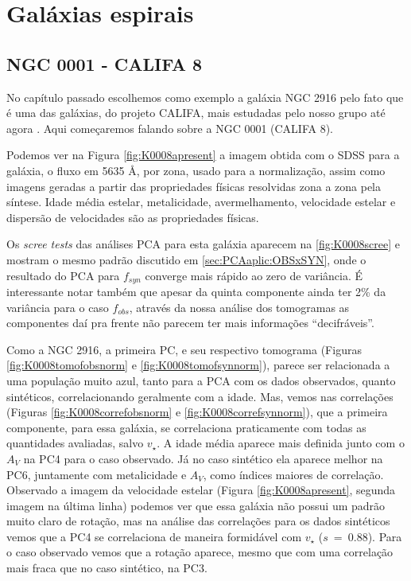 \section{Galáxias espirais}
\label{sec:result:spirals}

\subsection{NGC 0001 - CALIFA 8}

No capítulo passado escolhemos como exemplo a galáxia NGC 2916 pelo fato que é uma das galáxias, do projeto CALIFA, mais
estudadas pelo nosso grupo até agora \citep{CidFernandes2013, CidFernandes2014}. Aqui começaremos falando sobre a NGC
0001 (CALIFA 8). 

Podemos ver na Figura \ref{fig:K0008apresent} a imagem obtida com o SDSS para a galáxia, o fluxo em 5635 \AA, por zona,
usado para a normalização, assim como imagens geradas a partir das propriedades físicas resolvidas zona a zona pela
síntese. Idade média estelar, metalicidade, avermelhamento, velocidade estelar e dispersão de velocidades são
as propriedades físicas. 

Os {\em scree tests} das análises PCA para esta galáxia aparecem na \ref{fig:K0008scree} e mostram o mesmo padrão
discutido em \ref{sec:PCAaplic:OBSxSYN}, onde o resultado do PCA para $f_{syn}$ converge mais rápido ao zero de
variância. É interessante notar também que apesar da quinta componente ainda ter 2\% da variância para o caso $f_{obs}$,
através da nossa análise dos tomogramas as componentes daí pra frente não parecem ter mais informações ``decifráveis''.

Como a NGC 2916, a primeira PC, e seu respectivo tomograma (Figuras \ref{fig:K0008tomofobsnorm} e
\ref{fig:K0008tomofsynnorm}), parece ser relacionada a uma população muito azul, tanto para a PCA com os dados
observados, quanto sintéticos, correlacionando geralmente com a idade. Mas, vemos nas correlações (Figuras
\ref{fig:K0008correfobsnorm} e \ref{fig:K0008correfsynnorm}), que a primeira componente, para essa galáxia, se
correlaciona praticamente com todas as quantidades avaliadas, salvo $v_\star$. A idade média aparece mais definida junto
com o $A_V$ na PC4 para o caso observado. Já no caso sintético ela aparece melhor na PC6, juntamente com metalicidade e
$A_V$, como índices maiores de correlação. Observado a imagem da velocidade estelar (Figura \ref{fig:K0008apresent},
segunda imagem na última linha) podemos ver que essa galáxia não possui um padrão muito claro de rotação, mas na análise das
correlações para os dados sintéticos vemos que a PC4 se correlaciona de maneira formidável com $v_\star$ ($s\ =\ 0.88$).
Para o caso observado vemos que a rotação aparece, mesmo que com uma correlação mais fraca que no caso sintético, na
PC3.

